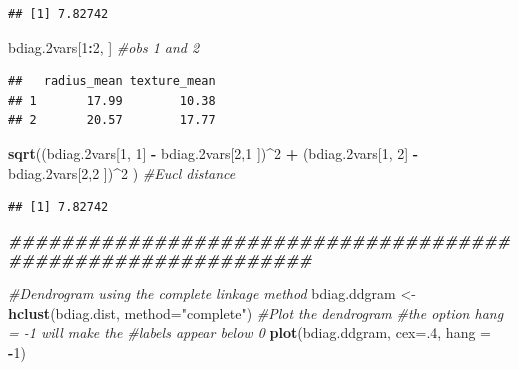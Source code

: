 \documentclass[
]{book}
\newenvironment{Shaded}{\begin{snugshade}}{\end{snugshade}}
\newcommand{\AttributeTok}[1]{\textcolor[rgb]{0.13,0.29,0.53}{#1}}
\newcommand{\CommentTok}[1]{\textcolor[rgb]{0.56,0.35,0.01}{\textit{#1}}}
\newcommand{\DecValTok}[1]{\textcolor[rgb]{0.00,0.00,0.81}{#1}}
\newcommand{\DocumentationTok}[1]{\textcolor[rgb]{0.56,0.35,0.01}{\textbf{\textit{#1}}}}
\newcommand{\FloatTok}[1]{\textcolor[rgb]{0.00,0.00,0.81}{#1}}
\newcommand{\FunctionTok}[1]{\textcolor[rgb]{0.13,0.29,0.53}{\textbf{#1}}}
\newcommand{\NormalTok}[1]{#1}
\newcommand{\OtherTok}[1]{\textcolor[rgb]{0.56,0.35,0.01}{#1}}
\newcommand{\SpecialCharTok}[1]{\textcolor[rgb]{0.81,0.36,0.00}{\textbf{#1}}}
\newcommand{\StringTok}[1]{\textcolor[rgb]{0.31,0.60,0.02}{#1}}
\begin{document}
\begin{verbatim}
## [1] 7.82742
\end{verbatim}

\begin{Shaded}
\begin{Highlighting}[]
\NormalTok{      bdiag}\FloatTok{.2}\NormalTok{vars[}\DecValTok{1}\SpecialCharTok{:}\DecValTok{2}\NormalTok{, ] }\CommentTok{\#obs 1 and 2}
\end{Highlighting}
\end{Shaded}

\begin{verbatim}
##   radius_mean texture_mean
## 1       17.99        10.38
## 2       20.57        17.77
\end{verbatim}

\begin{Shaded}
\begin{Highlighting}[]
      \FunctionTok{sqrt}\NormalTok{((bdiag}\FloatTok{.2}\NormalTok{vars[}\DecValTok{1}\NormalTok{, }\DecValTok{1}\NormalTok{] }\SpecialCharTok{{-}}\NormalTok{ bdiag}\FloatTok{.2}\NormalTok{vars[}\DecValTok{2}\NormalTok{,}\DecValTok{1}\NormalTok{ ])}\SpecialCharTok{\^{}}\DecValTok{2} \SpecialCharTok{+} 
\NormalTok{        (bdiag}\FloatTok{.2}\NormalTok{vars[}\DecValTok{1}\NormalTok{, }\DecValTok{2}\NormalTok{] }\SpecialCharTok{{-}}\NormalTok{ bdiag}\FloatTok{.2}\NormalTok{vars[}\DecValTok{2}\NormalTok{,}\DecValTok{2}\NormalTok{ ])}\SpecialCharTok{\^{}}\DecValTok{2}\NormalTok{ )  }\CommentTok{\#Eucl distance}
\end{Highlighting}
\end{Shaded}

\begin{verbatim}
## [1] 7.82742
\end{verbatim}

\begin{Shaded}
\begin{Highlighting}[]
      \DocumentationTok{\#\#\#\#\#\#\#\#\#\#\#\#\#\#\#\#\#\#\#\#\#\#\#\#\#\#\#\#\#\#\#\#\#\#\#\#\#\#\#\#\#\#\#\#\#\#\#\#\#\#\#\#\#\#\#\#\#\#\#\#\#}

\CommentTok{\#Dendrogram using the complete linkage method}
\NormalTok{bdiag.ddgram }\OtherTok{\textless{}{-}} \FunctionTok{hclust}\NormalTok{(bdiag.dist, }\AttributeTok{method=}\StringTok{"complete"}\NormalTok{)}
\CommentTok{\#Plot the dendrogram}
\CommentTok{\#the option hang = {-}1 will make the}
\CommentTok{\#labels appear below 0}
\FunctionTok{plot}\NormalTok{(bdiag.ddgram, }\AttributeTok{cex=}\NormalTok{.}\DecValTok{4}\NormalTok{, }\AttributeTok{hang =} \SpecialCharTok{{-}}\DecValTok{1}\NormalTok{)}
\end{Highlighting}
\end{Shaded}
\end{document}

